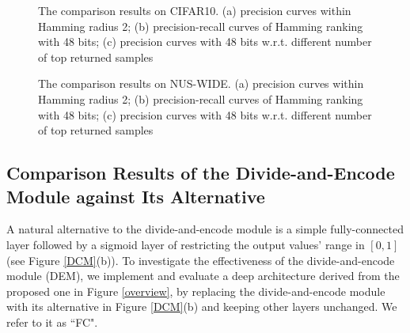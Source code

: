 \documentclass[10pt,twocolumn,letterpaper]{article}
\begin{document}
\begin{figure*}[ht!]
  \begin{flushleft}
  \centering
  \caption{\footnotesize The comparison results on CIFAR10. (a) precision curves within Hamming radius 2; (b) precision-recall curves of Hamming ranking with 48 bits; (c) precision curves with 48 bits w.r.t. different number of top returned samples}
  \label{fig: cifar10-result}
  \end{flushleft}
\end{figure*}
\begin{figure*}[ht!]
  \begin{flushleft}
  \centering
  \caption{\footnotesize The comparison results on NUS-WIDE. (a) precision curves within Hamming radius 2; (b) precision-recall curves of Hamming ranking with 48 bits; (c) precision curves with 48 bits w.r.t. different number of top returned samples}
  \label{fig: NUSWIDE-result}
  \end{flushleft}
\end{figure*}



\subsection{Comparison Results of the Divide-and-Encode Module against Its Alternative}
A natural alternative to the divide-and-encode module is a simple fully-connected layer followed by a sigmoid layer of restricting the output values' range in $[0,1]$ (see Figure \ref{DCM}(b)). To investigate the effectiveness of the divide-and-encode module (DEM), we implement and evaluate a deep architecture derived from the proposed one in Figure \ref{overview}, by replacing the divide-and-encode module with its alternative in Figure \ref{DCM}(b) and keeping other layers unchanged. We refer to it as ``FC".
\end{document}
